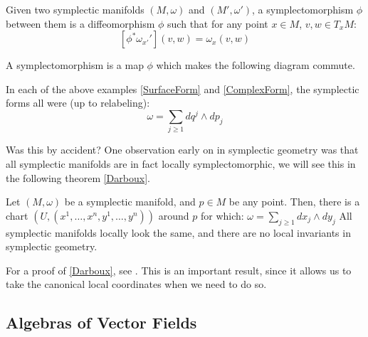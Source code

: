 \begin{defn}[Symplectomorphism]
Given two symplectic manifolds $(M, \omega)$ and $(M', \omega')$, a symplectomorphism $\phi$ between them is a diffeomorphism $\phi$ such that for any point $x \in M$, $v, w \in T_{x} M$:
$$\left[ \phi^{*} \omega_{x'}' \right](v,w) = \omega_{x}(v,w)$$

\begin{center}

\end{center}

\noindent A symplectomorphism is a map $\phi$ which makes the following diagram commute.
\end{defn}

\noindent In each of the above examples \ref{SurfaceForm} and \ref{ComplexForm}, the symplectic forms all were (up to relabeling):
\[ \omega = \sum_{j \geq 1} dq^{j} \wedge dp_{j} \]

\begin{remark}
Was this by accident? One observation early on in symplectic geometry was that all symplectic manifolds are in fact locally symplectomorphic, we will see this in the following theorem \ref{Darboux}.
\end{remark}

\begin{theorem}
\label{Darboux}
Let \((M, \omega)\) be a symplectic manifold, and \(p \in M\) be any point. Then, there is a chart \((U, (x^1, \dots, x^n, y^1, \dots, y^n))\) around \(p\) for which: $\omega = \sum_{j \geq 1} dx_{j} \wedge dy_{j}$
All symplectic manifolds locally look the same, and there are no local invariants in symplectic geometry. 
\end{theorem}

For a proof of \ref{Darboux}, see \cite{Arnold2010}. This is an important result, since it allows us to take the canonical local coordinates when we need to do so.  

\subsection{Algebras of Vector Fields}

